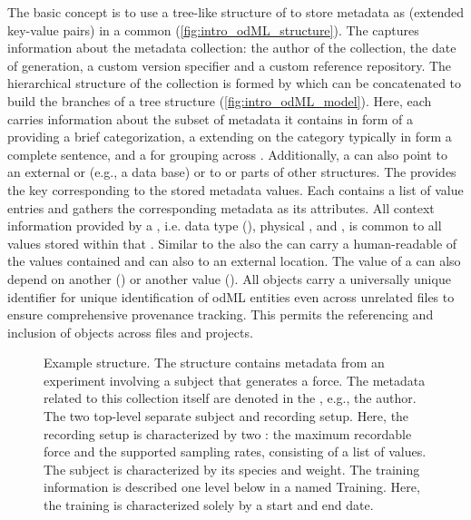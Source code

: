 The basic concept is to use a tree-like structure of  to store metadata as  (extended key-value pairs) in a common  (\cref{fig:intro_odML_structure}). The  captures information about the metadata collection: the author of the collection, the date of generation, a custom version specifier and a custom reference repository. The hierarchical structure of the collection is formed by  which can be concatenated to build the branches of a tree structure (\cref{fig:intro_odML_model}). Here, each  carries information about the subset of metadata it contains in form of a   providing a brief categorization, a  extending on the category typically in form a complete sentence, and a  for grouping across . Additionally, a  can also point to an external  or  (e.g., a data base) or  to or  parts of other  structures. The   provides the key corresponding to the stored metadata values. Each  contains a list of value entries and gathers the corresponding metadata as its  attributes. 
All context information provided by a , i.e. data type (), physical ,  and , is common to all values stored within that .  Similar to the  also the  can carry a human-readable  of the values contained and can also  to an external location. The value of a  can also depend on another  () or another  value (). All  objects carry a universally unique identifier for unique identification of odML entities even across unrelated files to ensure comprehensive provenance tracking. This permits the referencing and inclusion of  objects across files and projects.\\



\begin{figure}[hp]
 \centering
 \scalebox{0.45}{
 }
 \caption[Example  structure]{Example  structure. The  structure contains metadata from an experiment involving a subject that generates a force. The metadata related to this collection itself are denoted in the  , e.g., the author. The two top-level  separate subject and recording setup. Here, the recording setup is characterized by two : the maximum recordable force and the supported sampling rates, consisting of a list of values. The subject is characterized by its species and weight. The training information is described one level below in a  named Training. Here, the training is characterized solely by a start and end date.}
 \label{fig:intro_example_odml_structure}
\end{figure}

